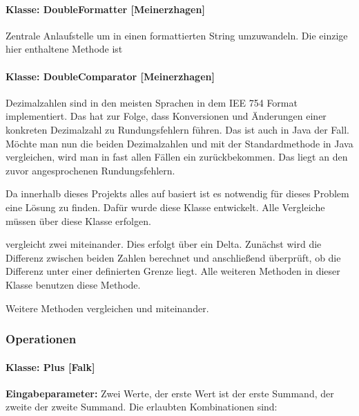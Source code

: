 \paragraph{Klasse: DoubleFormatter [Meinerzhagen]}

Zentrale Anlaufstelle um  in einen formattierten String umzuwandeln. Die einzige hier enthaltene Methode ist 


\paragraph{Klasse: DoubleComparator [Meinerzhagen]}

Dezimalzahlen sind in den meisten Sprachen in dem IEE 754 Format implementiert. Das hat zur Folge, dass Konversionen und Änderungen einer konkreten Dezimalzahl zu Rundungsfehlern führen. Das ist auch in Java der Fall. Möchte man nun die beiden Dezimalzahlen  und  mit der Standardmethode in Java vergleichen, wird man in fast allen Fällen ein  zurückbekommen. Das liegt an den zuvor angesprochenen Rundungsfehlern. 

Da innerhalb dieses Projekts alles auf  basiert ist es notwendig für dieses Problem eine Lösung zu finden. Dafür wurde diese Klasse entwickelt. Alle Vergleiche müssen über diese Klasse erfolgen.

 vergleicht zwei  miteinander. Dies erfolgt über ein Delta. Zunächst wird die Differenz zwischen beiden Zahlen berechnet und anschließend überprüft, ob die Differenz unter einer definierten Grenze liegt. Alle weiteren Methoden in dieser Klasse benutzen diese Methode.

Weitere Methoden vergleichen  und  miteinander.

\subsubsection{Operationen}

\paragraph{Klasse: Plus [Falk]}

\textbf{Eingabeparameter: }Zwei Werte, der erste Wert ist der erste Summand, der zweite der zweite Summand. Die erlaubten Kombinationen sind: 

